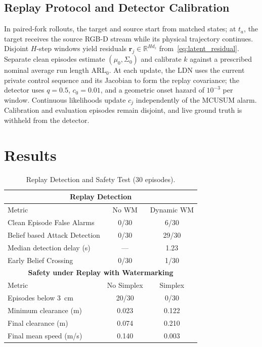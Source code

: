 \documentclass[letterpaper, 10 pt, conference]{ieeeconf}
\theoremstyle{plain}
\begin{document}
\subsection{Replay Protocol and Detector Calibration}
In paired-fork rollouts, the target and source start from matched states; at $t_a$, the target receives the source RGB-D stream while its physical trajectory continues. Disjoint $H$-step windows yield residuals $\mathbf r_j\in\mathbb{R}^{Hd_z}$ from~\eqref{eq:latent_residual}. Separate clean episodes estimate $(\mu_0,\Sigma_0)$ and calibrate $k$ against a prescribed nominal average run length $\mathrm{ARL}_0$. At each update, the LDN uses the current private control sequence and its Jacobian to form the replay covariance; the detector uses $q=0.5$, $c_0=0.01$, and a geometric onset hazard of $10^{-3}$ per window. Continuous likelihoods update $c_j$ independently of the MCUSUM alarm. Calibration and evaluation episodes remain disjoint, and live ground truth is withheld from the detector.

\section{Results}
\label{sec:results}

\begin{table}[t]
    \centering
    \caption{Replay Detection and Safety Test
    (30 episodes).}
    \label{tab:ur5_results}
    \small
    \setlength{\tabcolsep}{3pt}
    \begin{tabular}{lcc}
        \hline
        \multicolumn{3}{c}{\textbf{Replay Detection}} \\
        \hline
        Metric & No WM & Dynamic WM \\
        \hline
        Clean Episode False Alarms & 0/30 & 6/30 \\
        Belief based Attack Detection & 0/30 & 29/30 \\
        Median detection delay (s) & --- & 1.23 \\
        Early Belief Crossing & 0/30 & 1/30 \\
        \hline
        \multicolumn{3}{c}{\textbf{Safety under Replay with Watermarking}} \\
        \hline
        Metric & No Simplex & Simplex \\
        \hline
        Episodes below 3~cm & 20/30 & 0/30 \\
        Minimum clearance (m) & 0.023 & 0.122 \\
        Final clearance (m) & 0.074 & 0.210 \\
        Final mean speed (m/s) & 0.140 & 0.003 \\
        \hline
    \end{tabular}
\end{table}
\end{document}
